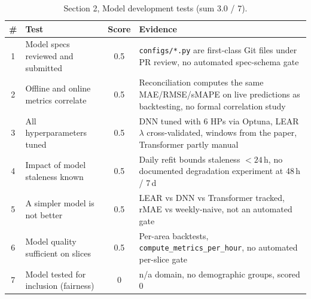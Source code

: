 \begin{table}[h]
  \centering
  \footnotesize
  \caption{Section 2, Model development tests (sum 3.0 / 7).}
  \renewcommand{\arraystretch}{1.3}
  \begin{tabularx}{\linewidth}{@{}c >{\raggedright\arraybackslash}p{3.9cm} c >{\raggedright\arraybackslash}X@{}}
    \toprule
    \textbf{\#} & \textbf{Test} & \textbf{Score} & \textbf{Evidence} \\
    \midrule
    1 & Model specs reviewed and submitted & 0.5 & \texttt{configs/*.py} are first-class Git files under PR review, no automated spec-schema gate \\
    2 & Offline and online metrics correlate & 0.5 & Reconciliation computes the same MAE/RMSE/sMAPE on live predictions as backtesting, no formal correlation study \\
    3 & All hyperparameters tuned & 0.5 & DNN tuned with 6 HPs via Optuna, LEAR $\lambda$ cross-validated, windows from the paper, Transformer partly manual \\
    4 & Impact of model staleness known & 0.5 & Daily refit bounds staleness $<24$\,h, no documented degradation experiment at 48\,h / 7\,d \\
    5 & A simpler model is not better & 0.5 & LEAR vs DNN vs Transformer tracked, rMAE vs weekly-naive, not an automated gate \\
    6 & Model quality sufficient on slices & 0.5 & Per-area backtests, \texttt{compute\_metrics\_per\_hour}, no automated per-slice gate \\
    7 & Model tested for inclusion (fairness) & 0 & n/a domain, no demographic groups, scored 0 \\
    \bottomrule
  \end{tabularx}
\end{table}

